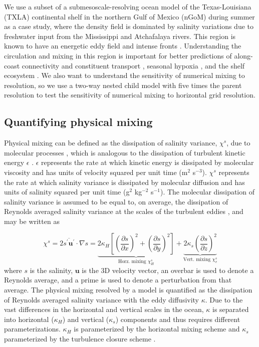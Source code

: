 We use a subset of a submesoscale-resolving ocean model of the Texas-Louisiana (TXLA) continental shelf in the northern Gulf of Mexico (nGoM) during summer as a case study, where the density field is dominated by salinity variations due to freshwater input from the Mississippi and Atchafalaya rivers. This region is known to have an energetic eddy field \citep{Hetland_2017} and intense fronts \citep{qu2022rapid}. Understanding the circulation and mixing in this region is important for better predictions of along-coast connectivity and constituent transport \citep{thyng2023seasonal}, seasonal hypoxia \citep{Xomchuk_2020, zhang2015processes}, and the shelf ecosystem \citep{fennel2011coupled}. We also want to understand the sensitivity of numerical mixing to resolution, so we use a two-way nested child model with five times the parent resolution to test the sensitivity of numerical mixing to horizontal grid resolution. 

\subsection{Quantifying physical mixing}

Physical mixing can be defined as the dissipation of salinity variance, $\chi^s$, due to molecular processes \citep{Burchard_2009}, which is analogous to the dissipation of turbulent kinetic energy $\epsilon$ \citep{MacCready_2018}. $\epsilon$ represents the rate at which kinetic energy is dissipated by molecular viscosity and has units of velocity squared per unit time (m$^2$ s$^{-3}$). $\chi^s$ represents the rate at which salinity variance is dissipated by molecular diffusion \citep{Nash_2002} and has units of salinity squared per unit time (g$^2$ kg$^{-2}$ s$^{-1}$). The molecular dissipation of salinity variance is assumed to be equal to, on average, the dissipation of Reynolds averaged salinity variance at the scales of the turbulent eddies \citep{Burchard_2008, Nash_2002, osborn1972oceanic}, and may be written as

\begin{equation} \label{eq:chi_whole}
    \chi^s = 2 \overline{s^\prime \mathbf{u}^\prime} \cdot \nabla s = \underbrace{2\kappa_H \left[\left(\frac{\partial s}{\partial x}\right)^2 + \left(\frac{\partial s}{\partial y} \right)^2 \right]}_{\text{Horz. mixing $\chi_H^s$}}+\underbrace{2 \kappa_s \left(\frac{\partial s}{\partial z} \right)^2}_{\text{Vert. mixing $\chi_v^s$}}
\end{equation}
where $s$ is the salinity, $\mathbf{u}$ is the 3D velocity vector, an overbar is used to denote a Reynolds average, and a prime is used to denote a perturbation from that average. The physical mixing resolved by a model is quantified as the dissipation of Reynolds averaged salinity variance with the eddy diffusivity $\kappa$. Due to the vast differences in the horizontal and vertical scales in the ocean, $\kappa$ is separated into horizontal ($\kappa_H$) and vertical ($\kappa_s$) components and thus requires different parameterizations. $\kappa_H$ is parameterized by the horizontal mixing scheme and $\kappa_s$ parameterized by the turbulence closure scheme \citep{Burchard_2008, MacCready_2018}. 

